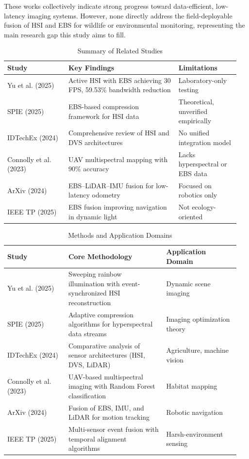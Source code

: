 \documentclass[conference]{IEEEtran}
\begin{document}
These works collectively indicate strong progress toward data-efficient, low-latency imaging systems. However, none directly address the field-deployable fusion of HSI and EBS for wildlife or environmental monitoring, representing the main research gap this study aims to fill.

\begin{table}[H]
\centering
\caption{Summary of Related Studies}
\label{tab:lit_review}
\begin{tabular}{@{}p{0.25\linewidth} p{0.45\linewidth} p{0.25\linewidth}@{}}
\toprule
\textbf{Study} & \textbf{Key Findings} & \textbf{Limitations} \\
\midrule
Yu et al. (2025) \cite{yu2025active} & Active HSI with EBS achieving 30 FPS, 59.53\% bandwidth reduction & Laboratory-only testing \\
SPIE (2025) \cite{spie2025} & EBS-based compression framework for HSI data & Theoretical, unverified empirically \\
IDTechEx (2024) \cite{idtechex2024} & Comprehensive review of HSI and DVS architectures & No unified integration model \\
Connolly et al. (2023) \cite{connolly2023} & UAV multispectral mapping with 90\% accuracy & Lacks hyperspectral or EBS data \\
ArXiv (2024) \cite{arxiv2024} & EBS–LiDAR–IMU fusion for low-latency odometry & Focused on robotics only \\
IEEE TP (2025) \cite{ieee2025} & EBS fusion improving navigation in dynamic light & Not ecology-oriented \\
\bottomrule
\end{tabular}
\end{table}

\begin{table}[H]
\centering
\caption{Methods and Application Domains}
\label{tab:methods_applications}
\begin{tabular}{@{}p{0.25\linewidth} p{0.40\linewidth} p{0.30\linewidth}@{}}
\toprule
\textbf{Study} & \textbf{Core Methodology} & \textbf{Application Domain} \\
\midrule
Yu et al. (2025) \cite{yu2025active} & Sweeping rainbow illumination with event-synchronized HSI reconstruction & Dynamic scene imaging \\
SPIE (2025) \cite{spie2025} & Adaptive compression algorithms for hyperspectral data streams & Imaging optimization theory \\
IDTechEx (2024) \cite{idtechex2024} & Comparative analysis of sensor architectures (HSI, DVS, LiDAR) & Agriculture, machine vision \\
Connolly et al. (2023) \cite{connolly2023} & UAV-based multispectral imaging with Random Forest classification & Habitat mapping \\
ArXiv (2024) \cite{arxiv2024} & Fusion of EBS, IMU, and LiDAR for motion tracking & Robotic navigation \\
IEEE TP (2025) \cite{ieee2025} & Multi-sensor event fusion with temporal alignment algorithms & Harsh-environment sensing \\
\bottomrule
\end{tabular}
\end{table}
\end{document}
